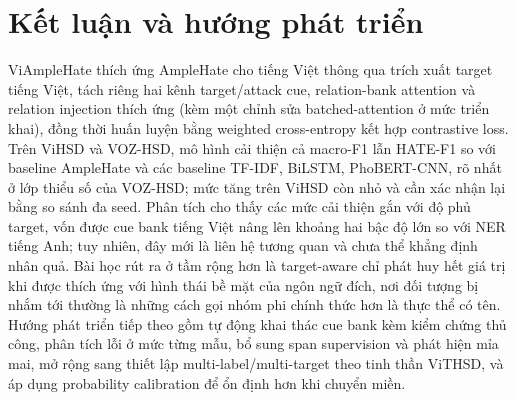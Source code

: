 \documentclass[11pt]{article}
\begin{document}
\section{Kết luận và hướng phát triển}
ViAmpleHate thích ứng AmpleHate cho tiếng Việt thông qua trích xuất target tiếng Việt, tách riêng hai kênh target/attack cue, relation-bank attention và relation injection thích ứng (kèm một chỉnh sửa batched-attention ở mức triển khai), đồng thời huấn luyện bằng weighted cross-entropy kết hợp contrastive loss. Trên ViHSD và VOZ-HSD, mô hình cải thiện cả macro-F1 lẫn HATE-F1 so với baseline AmpleHate và các baseline TF-IDF, BiLSTM, PhoBERT-CNN, rõ nhất ở lớp thiểu số của VOZ-HSD; mức tăng trên ViHSD còn nhỏ và cần xác nhận lại bằng so sánh đa seed. Phân tích cho thấy các mức cải thiện gắn với độ phủ target, vốn được cue bank tiếng Việt nâng lên khoảng hai bậc độ lớn so với NER tiếng Anh; tuy nhiên, đây mới là liên hệ tương quan và chưa thể khẳng định nhân quả. Bài học rút ra ở tầm rộng hơn là target-aware chỉ phát huy hết giá trị khi được thích ứng với hình thái bề mặt của ngôn ngữ đích, nơi đối tượng bị nhắm tới thường là những cách gọi nhóm phi chính thức hơn là thực thể có tên. Hướng phát triển tiếp theo gồm tự động khai thác cue bank kèm kiểm chứng thủ công, phân tích lỗi ở mức từng mẫu, bổ sung span supervision và phát hiện mỉa mai, mở rộng sang thiết lập multi-label/multi-target theo tinh thần ViTHSD, và áp dụng probability calibration để ổn định hơn khi chuyển miền.




\appendix
\end{document}
